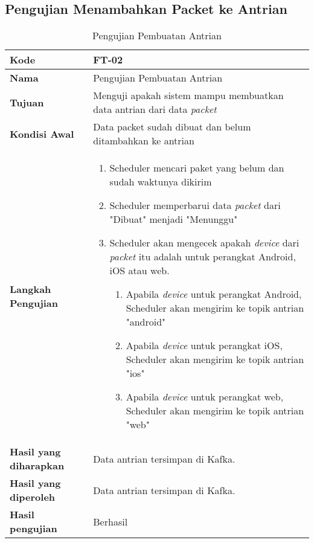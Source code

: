\subsection{Pengujian Menambahkan Packet ke Antrian}
\begin{longtable}{|p{2.5cm}|p{6.5cm}|}
	\caption{Pengujian Pembuatan Antrian} \label{t:uji_pembuatan_antrian} \\ \hline
	\textbf{Kode} & FT-02 \\ \hline
	\textbf{Nama} & Pengujian Pembuatan Antrian \\ \hline
	\textbf{Tujuan} & Menguji apakah sistem mampu membuatkan data antrian dari data \textit{packet} \\ \hline
	\textbf{Kondisi Awal} & Data packet sudah dibuat dan belum ditambahkan ke antrian \\ \hline
	\textbf{Langkah Pengujian} &  
	\begin{enumerate}
		\item Scheduler mencari paket yang belum dan sudah waktunya dikirim
		\item Scheduler memperbarui data \textit{packet} dari "Dibuat" menjadi "Menunggu"
		\item Scheduler akan mengecek apakah \textit{device} dari \textit{packet} itu adalah untuk perangkat Android, iOS atau web.
		\begin{enumerate}
			\item Apabila \textit{device} untuk perangkat Android, Scheduler akan mengirim ke topik antrian "android"
			\item Apabila \textit{device} untuk perangkat iOS, Scheduler akan mengirim ke topik antrian "ios"
			\item Apabila \textit{device} untuk perangkat web, Scheduler akan mengirim ke topik antrian "web"
		\end{enumerate}
	\end{enumerate} \\ \hline
	\textbf{Hasil yang diharapkan} & Data antrian tersimpan di Kafka. \\ \hline
	\textbf{Hasil yang diperoleh} & Data antrian tersimpan di Kafka. \\ \hline
	\textbf{Hasil pengujian} & Berhasil \\ \hline
\end{longtable}

